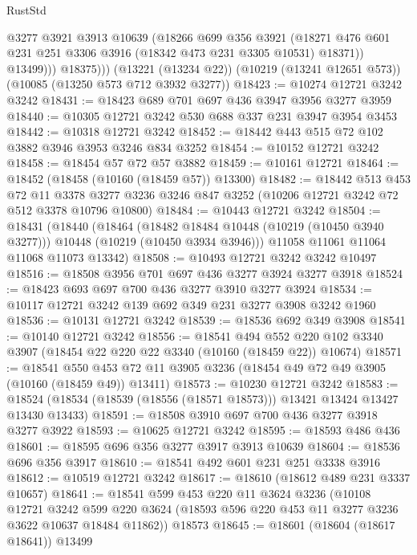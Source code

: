 \begin{lexlean}{RustStd}
\begin{coremodule}
                @3277
                @3921
                @3913
                @10639
                (@18266
                  @699
                  @356
                  @3921
                  (@18271 @476 @601 @231 @251 @3306 @3916 (@18342 @473 @231 @3305 @10531) @18371))
                @13499)))
          @18375)))
    (@13221 (@13234 @22))
    (@10219 (@13241 @12651 @573))
    (@10085 (@13250 @573 @712 @3932 @3277))
@18423 := @10274 @12721 @3242 @3242
@18431 := @18423 @689 @701 @697 @436 @3947 @3956 @3277 @3959
@18440 := @10305 @12721 @3242 @530 @688 @337 @231 @3947 @3954 @3453
@18442 := @10318 @12721 @3242
@18452 := @18442 @443 @515 @72 @102 @3882 @3946 @3953 @3246 @834 @3252
@18454 := @10152 @12721 @3242
@18458 := @18454 @57 @72 @57 @3882
@18459 := @10161 @12721
@18464 := @18452 (@18458 (@10160 (@18459 @57)) @13300)
@18482 := @18442
    @513
    @453
    @72
    @11
    @3378
    @3277
    @3236
    @3246
    @847
    @3252
    (@10206 @12721 @3242 @72 @512 @3378 @10796 @10800)
@18484 := @10443 @12721 @3242
@18504 := @18431
    (@18440
      (@18464
        (@18482 @18484 @10448 (@10219 (@10450 @3940 @3277)))
        @10448
        (@10219 (@10450 @3934 @3946)))
      @11058
      @11061
      @11064
      @11068
      @11073
      @13342)
@18508 := @10493 @12721 @3242 @3242 @10497
@18516 := @18508 @3956 @701 @697 @436 @3277 @3924 @3277 @3918
@18524 := @18423 @693 @697 @700 @436 @3277 @3910 @3277 @3924
@18534 := @10117 @12721 @3242 @139 @692 @349 @231 @3277 @3908 @3242 @1960
@18536 := @10131 @12721 @3242
@18539 := @18536 @692 @349 @3908
@18541 := @10140 @12721 @3242
@18556 := @18541
    @494
    @552
    @220
    @102
    @3340
    @3907
    (@18454 @22 @220 @22 @3340 (@10160 (@18459 @22)) @10674)
@18571 := @18541
    @550
    @453
    @72
    @11
    @3905
    @3236
    (@18454 @49 @72 @49 @3905 (@10160 (@18459 @49)) @13411)
@18573 := @10230 @12721 @3242
@18583 := @18524 (@18534 (@18539 (@18556 (@18571 @18573))) @13421 @13424 @13427 @13430 @13433)
@18591 := @18508 @3910 @697 @700 @436 @3277 @3918 @3277 @3922
@18593 := @10625 @12721 @3242
@18595 := @18593 @486 @436
@18601 := @18595 @696 @356 @3277 @3917 @3913 @10639
@18604 := @18536 @696 @356 @3917
@18610 := @18541 @492 @601 @231 @251 @3338 @3916
@18612 := @10519 @12721 @3242
@18617 := @18610 (@18612 @489 @231 @3337 @10657)
@18641 := @18541
    @599
    @453
    @220
    @11
    @3624
    @3236
    (@10108
      @12721
      @3242
      @599
      @220
      @3624
      (@18593 @596 @220 @453 @11 @3277 @3236 @3622 @10637 @18484 @11862))
    @18573
@18645 := @18601 (@18604 (@18617 @18641)) @13499

\end{coremodule}
\end{lexlean}
